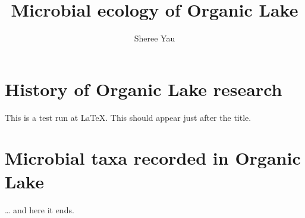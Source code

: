 \documentclass[a4paper,11pt]{report}
\author{Sheree Yau}
\title{Microbial ecology of Organic Lake}
\begin{document}
\maketitle
\tableofcontents
\section{History of Organic Lake research}

This is a test run at \LaTeX. This should appear just after the title.

\section{Microbial taxa recorded in Organic Lake}

\ldots{} and here it ends.

\end{document}
